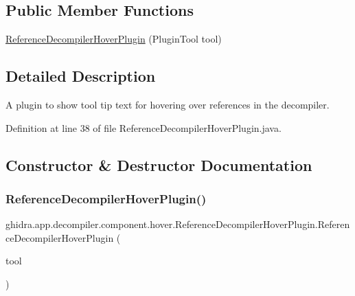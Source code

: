 \subsection*{Public Member Functions}
\begin{DoxyCompactItemize}
\item 
\mbox{\hyperlink{classghidra_1_1app_1_1decompiler_1_1component_1_1hover_1_1_reference_decompiler_hover_plugin_ac8cc1f5791fbc390bcec307b86460593}{Reference\+Decompiler\+Hover\+Plugin}} (Plugin\+Tool tool)
\end{DoxyCompactItemize}


\subsection{Detailed Description}
A plugin to show tool tip text for hovering over references in the decompiler. 

Definition at line 38 of file Reference\+Decompiler\+Hover\+Plugin.\+java.



\subsection{Constructor \& Destructor Documentation}
\mbox{\label{classghidra_1_1app_1_1decompiler_1_1component_1_1hover_1_1_reference_decompiler_hover_plugin_ac8cc1f5791fbc390bcec307b86460593}} 
\subsubsection{\texorpdfstring{ReferenceDecompilerHoverPlugin()}{ReferenceDecompilerHoverPlugin()}}
{\footnotesize\ttfamily ghidra.\+app.\+decompiler.\+component.\+hover.\+Reference\+Decompiler\+Hover\+Plugin.\+Reference\+Decompiler\+Hover\+Plugin (\begin{DoxyParamCaption}\item[{Plugin\+Tool}]{tool }\end{DoxyParamCaption})\hspace{0.3cm}{\ttfamily [inline]}}



